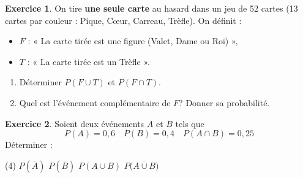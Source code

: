 \documentclass{exam}
\theoremstyle{definition}
\newtheorem{exercice}{Exercice}
\begin{document}
\begin{exercice}

On tire \textbf{une seule carte} au hasard dans un jeu de 52 cartes 
(13 cartes par couleur : Pique, Cœur, Carreau, Trèfle). On définit :
\begin{itemize}
  \item \(F\) : « La carte tirée est une figure (Valet, Dame ou Roi) »,
  \item \(T\) : « La carte tirée est un Trèfle ».
\end{itemize}
\begin{enumerate}
  \item Déterminer \(P(F \cup T)\) et \(P(F \cap T)\).
  \item Quel est l'événement complémentaire de \(F\)? Donner sa probabilité.
\end{enumerate}

\begin{center}
\end{center}
\end{exercice}

\begin{exercice}
Soient deux événements \(A\) et \(B\) tels que 
\[
P(A) = 0{,}6\quad P(B) = 0{,}4\quad P(A \cap B) = 0{,}25
\]
Déterminer :
\begin{tasks}[style=enumerate](4)
  \task \(P(\overline{A})\)
  \task \(P(\overline{B})\)
  \task \(P(A \cup B)\)
  \task \(P\bigl(\overline{A \cup B}\bigr)\)
\end{tasks}

\begin{center}
\end{center}
\end{exercice}
\end{document}
